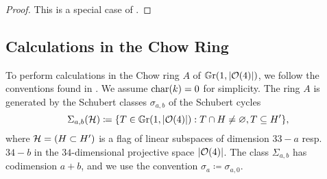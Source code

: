 \begin{proof}
			


This is a special case of .
\end{proof}

\subsection{Calculations in the Chow Ring}

To perform calculations in the Chow ring $A$ of $\mathbb G \mathrm r(1,\lvert\mathcal{O}(4)\rvert)$, we follow the conventions found in \cite{eisenbud-harris-intersection-theory}. We assume $\operatorname{char}(k) = 0$ for simplicity. The ring $A$ is generated by the Schubert classes $\sigma_{a,b}$ of the Schubert cycles
\[
	\Sigma_{a,b}(\mathcal{H})\coloneqq \{T \in \mathbb G \mathrm r(1,\lvert\mathcal{O}(4)\rvert) : T \cap H \neq \varnothing, T \subseteq H'\},
\]
where $\mathcal{H} = (H\subset H')$ is a flag of linear subspaces of dimension $33-a$ resp.\ $34-b$ in the $34$-dimensional projective space $\lvert\mathcal{O}(4)\rvert$. The class $\Sigma_{a,b}$ has codimension $a+b$, and we use the convention $\sigma_{a}\coloneqq \sigma_{a,0}$.

